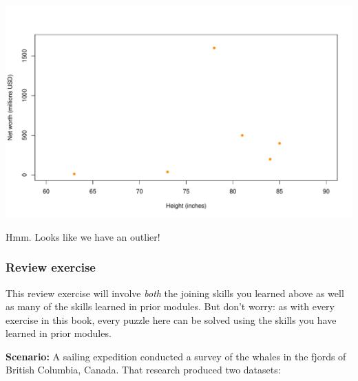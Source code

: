 \documentclass[
]{book}
\begin{document}
\includegraphics{figures/unnamed-chunk-191-1.pdf}

Hmm. Looks like we have an outlier!

\hypertarget{review-exercise-3}{%
\subsubsection*{Review exercise}\label{review-exercise-3}}

This review exercise will involve \emph{both} the joining skills you learned above as well as many of the skills learned in prior modules. But don't worry: as with every exercise in this book, every puzzle here can be solved using the skills you have learned in prior modules.

\textbf{Scenario:} A sailing expedition conducted a survey of the whales in the fjords of British Columbia, Canada. That research produced two datasets:
\end{document}
